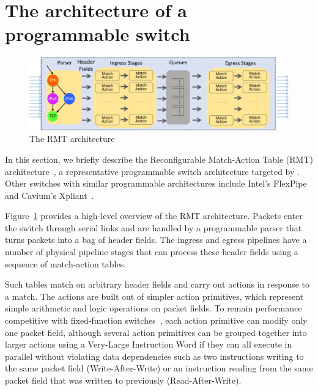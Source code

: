 \section{The architecture of a programmable switch}
\label{s:context}

\begin{figure}
\includegraphics[width=\textwidth]{p4_switch_model.png}
\caption{The RMT architecture}
\label{fig:architecture}
\end{figure}

\label{s:architecture}
In this section, we briefly describe the Reconfigurable Match-Action Table
(RMT) architecture~\cite{rmt}, a representative programmable switch
architecture targeted by \pktlanguage{}. Other switches with similar
programmable architectures include Intel's FlexPipe~\cite{flexpipe} and
Cavium's Xpliant~\cite{xpliant}.

Figure~\ref{fig:architecture} provides a high-level overview of the RMT
architecture. Packets enter the switch through serial links and are handled by
a programmable parser that turns packets into a bag of header fields. The
ingress and egress pipelines have a number of physical pipeline stages that can
process these header fields using a sequence of match-action tables.

Such tables match on arbitrary header fields and carry out actions in response
to a match.  The actions are built out of simpler action primitives, which
represent simple arithmetic and logic operations on packet fields. To remain
performance competitive with fixed-function switches~\cite{mellanox, trident,
tomahawk}, each action primitive can modify only one packet field, although
several action primitives can be grouped together into larger actions using a
Very-Large Instruction Word if they can all execute in parallel without
violating data dependencies such as two instructions writing to the same packet
field (Write-After-Write) or an instruction reading from the same packet field
that was written to previously (Read-After-Write).

